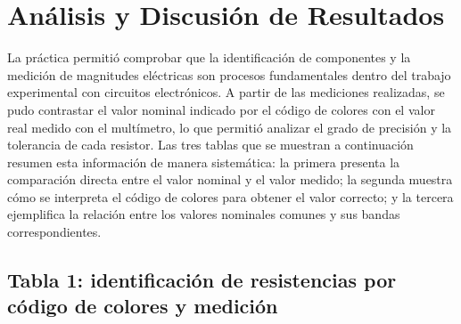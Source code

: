 \section{Análisis y Discusión de Resultados}

La práctica permitió comprobar que la identificación de componentes y la medición de magnitudes eléctricas son procesos fundamentales dentro del trabajo experimental con circuitos electrónicos. A partir de las mediciones realizadas, se pudo contrastar el valor nominal indicado por el código de colores con el valor real medido con el multímetro, lo que permitió analizar el grado de precisión y la tolerancia de cada resistor. Las tres tablas que se muestran a continuación resumen esta información de manera sistemática: la primera presenta la comparación directa entre el valor nominal y el valor medido; la segunda muestra cómo se interpreta el código de colores para obtener el valor correcto; y la tercera ejemplifica la relación entre los valores nominales comunes y sus bandas correspondientes.

\subsection{Tabla 1: identificación de resistencias por código de colores y medición}

